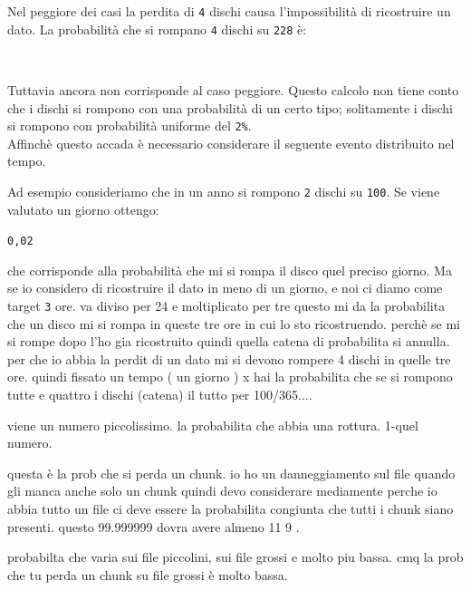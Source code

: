 Nel peggiore dei casi la perdita di \verb"4" dischi causa l'impossibilit\`{a} di ricostruire un dato.
La probabilit\`{a} che si rompano \verb"4" dischi su \verb"228" \`{e}:

\begin{center}
\Large
{} \cdot  {} \cdot {} \cdot {}\\
\end{center}
\normalsize

Tuttavia ancora non corrisponde al caso peggiore. Questo calcolo non tiene conto che i dischi si rompono con una probabilit\`{a} di un certo tipo; solitamente i dischi si rompono con probabilit\`{a} uniforme del \verb"2%".\\

Affinch\`{e} questo accada \`{e} necessario considerare il seguente evento distribuito nel tempo.

Ad esempio consideriamo che in un anno si rompono \verb"2" dischi su \verb"100".
Se viene valutato un giorno ottengo:

\begin{center}
\Large
{} \cdot \normalsize \verb"0,02"\\
\end{center}

che corrisponde alla probabilit\`{a} che mi si rompa il disco quel preciso giorno.
Ma se io considero di ricostruire il dato in meno di un giorno, e noi ci diamo come target \verb"3" ore.
va diviso per 24 e moltiplicato per tre questo mi da la probabilita che un disco mi si rompa in queste tre ore in cui lo sto ricostruendo.
perchè se mi si rompe dopo l'ho gia ricostruito quindi quella catena di probabilita si annulla.
per che io abbia la perdit di un dato mi si devono rompere 4 dischi in quelle tre ore. 
quindi fissato un tempo ( un giorno ) x hai la probabilita che se si rompono tutte e quattro i dischi (catena) il tutto per 100/365.... 

viene un numero piccolissimo.  la probabilita che abbia una rottura. 1-quel numero.

questa è la prob che si perda un chunk. io ho un danneggiamento sul file quando gli manca anche solo un chunk quindi devo considerare mediamente perche io abbia tutto un file ci deve essere la probabilita congiunta che tutti i chunk siano presenti. questo 99.999999 dovra avere almeno 11 9 .

probabilta che varia sui file piccolini, sui file grossi e molto piu bassa. cmq la prob che tu perda un chunk su file grossi è molto bassa.

